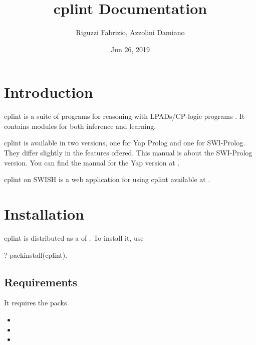 \documentclass[letterpaper,10pt,english]{sphinxmanual}
\title{cplint Documentation}
\date{Jun 26, 2019}
\author{Riguzzi Fabrizio, Azzolini Damiano}
\begin{document}
\pagestyle{empty}
\sphinxmaketitle
\pagestyle{plain}
\sphinxtableofcontents
\pagestyle{normal}
\label{\detokenize{index::doc}}



\chapter{Introduction}
\label{\detokenize{index:introduction}}
cplint is a suite of programs for reasoning with LPADs/CP-logic programs .
It contains modules for both inference and learning.

cplint is available in two versions, one for Yap Prolog and one for SWI-Prolog.
They differ slightly in the features offered.
This manual is about the SWI-Prolog version.
You can find the manual for the Yap version at .

cplint on SWISH is a web application for using cplint available at .


\chapter{Installation}
\label{\detokenize{index:installation}}
cplint is distributed as a  of .
To install it, use

\begin{sphinxVerbatim}[commandchars=\\\{\}]
?\PYGZhy{} pack\PYGZus{}install(cplint).
\end{sphinxVerbatim}


\section{Requirements}
\label{\detokenize{index:requirements}}
It requires the packs
\begin{itemize}
\item {} 

\item {} 

\item {} 

\end{itemize}
\end{document}
